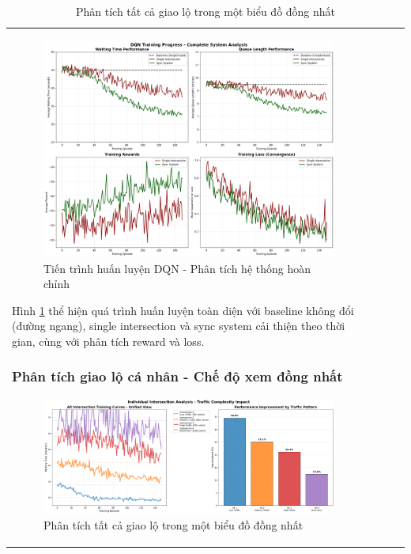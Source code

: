 \begin{table}[!htp]
\begin{tabular}{@{}lccc@{}}
\begin{figure}[!htp]
    \centering
    \includegraphics[width=\textwidth]{figures/01_training_progress.png}
    \caption{Tiến trình huấn luyện DQN - Phân tích hệ thống hoàn chỉnh}
    \label{fig:comprehensive_training_progress}
\end{figure}

Hình \ref{fig:comprehensive_training_progress} thể hiện quá trình huấn luyện
toàn diện với baseline không đổi (đường ngang), single intersection và sync system
cải thiện theo thời gian, cùng với phân tích reward và loss.

\subsubsection{Phân tích giao lộ cá nhân - Chế độ xem đồng nhất}

\begin{figure}[!htp]
    \centering
    \includegraphics[width=\textwidth]{figures/02_unified_intersections.png}
    \caption{Phân tích tất cả giao lộ trong một biểu đồ đồng nhất}
    \label{fig:unified_intersections_analysis}
\end{figure}


\end{tabular}
\end{table}
